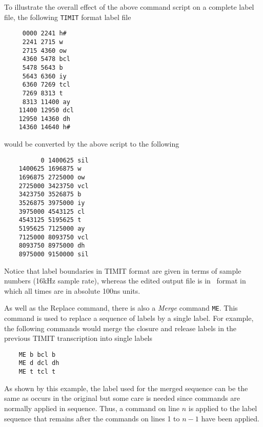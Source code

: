 To illustrate the overall effect of the above  command script on
a complete label file, the following \texttt{TIMIT} format label file
\begin{verbatim}
     0000 2241 h#
     2241 2715 w
     2715 4360 ow
     4360 5478 bcl
     5478 5643 b
     5643 6360 iy
     6360 7269 tcl
     7269 8313 t
     8313 11400 ay
    11400 12950 dcl
    12950 14360 dh
    14360 14640 h#
\end{verbatim}
would be converted by the above script to the following
\begin{verbatim}
          0 1400625 sil 
    1400625 1696875 w 
    1696875 2725000 ow 
    2725000 3423750 vcl 
    3423750 3526875 b 
    3526875 3975000 iy 
    3975000 4543125 cl 
    4543125 5195625 t 
    5195625 7125000 ay 
    7125000 8093750 vcl 
    8093750 8975000 dh 
    8975000 9150000 sil 
\end{verbatim}
Notice that label boundaries in TIMIT format are given in terms of sample
numbers (16kHz sample rate), whereas the edited output file is in 
\HTK\ format in which all times are in absolute 100ns units.  

As well as the Replace command, there is
also a {\it Merge} command \texttt{ME}.  This command is used 
to replace a sequence of labels by a single label.  
For example, the following commands would merge the closure and release
labels in the previous TIMIT transcription into single labels
\begin{verbatim}
    ME b bcl b
    ME d dcl dh
    ME t tcl t
\end{verbatim}
As shown by this example, the label used for the merged sequence can be
the same as occurs in the original but some care is needed since
 commands are normally applied in sequence.   Thus, a command
on line $n$ is applied to the label sequence that remains after the
commands on lines 1 to $n-1$ have been applied.

